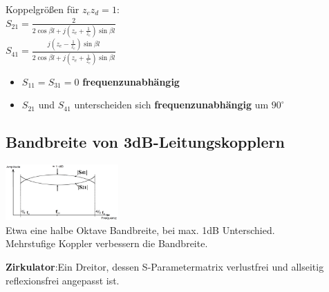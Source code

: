 \documentclass[english]{latex4ei/latex4ei_sheet}
\begin{document}
\begin{sectionbox}
    \begin{emphbox}
        Koppelgrößen für $z_e z_d = 1$:\\
        \vspace{1em}
        $S_{21}=\frac{2}{2 \cos \beta l+j\left(z_{e}+\frac{1}{z_{e}}\right) \sin \beta l}$\\
        $S_{41}=\frac{j\left(z_{e}-\frac{1}{z_{e}}\right) \sin \beta l}{2 \cos \beta l+j\left(z_{e}+\frac{1}{z_{e}}\right) \sin \beta l}$
        \begin{itemize}
            \item $S_{11} = S_{31} = 0$ \textbf{frequenzunabhängig}
            \item $S_{21}$ und $S_{41}$ unterscheiden sich \textbf{frequenzunabhängig} um $90^\circ$
        \end{itemize}
    \end{emphbox}
\end{sectionbox}
\begin{sectionbox}
    \subsection{Bandbreite von 3dB-Leitungskopplern}
    \includegraphics[width = 4.3cm]{./img/leitungskoppler_bb.png}\\
    Etwa eine halbe Oktave Bandbreite, bei max. 1dB Unterschied.\\
    Mehrstufige Koppler verbessern die Bandbreite.
\end{sectionbox}
\begin{sectionbox}
    \textbf{Zirkulator}:Ein Dreitor, dessen S-Parametermatrix verlustfrei und allseitig reflexionsfrei angepasst ist.
\end{sectionbox}
\end{document}

